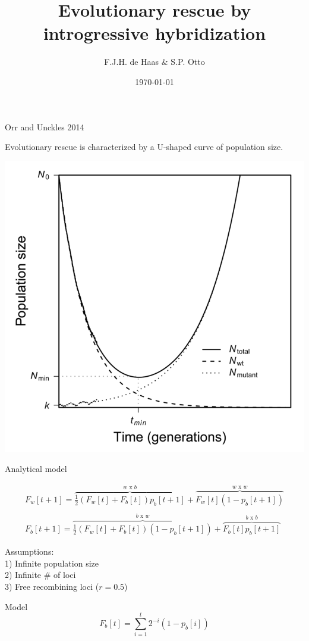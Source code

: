 \documentclass{beamer}
\title[lab meeting]{Evolutionary rescue by introgressive hybridization} %
\author{F.J.H. de Haas \& S.P. Otto} %
\date{\today} %
\begin{document}
\begin{frame}
\titlepage %
\end{frame}

\begin{frame}{Orr and Unckles 2014}

Evolutionary rescue is characterized by a U-shaped curve of population size.

\includegraphics[width=0.5\columnwidth]{Ushape_ER.png}

\end{frame}

\begin{frame}{Analytical model}

\begin{equation}
    \begin{array}{l}
	F_w[t+1] = \overbrace{\frac{1}{2} (F_w[t]+F_b[t]) p_b[t+1]}^\text{$w$ x $b$}  + \overbrace{F_w[t] (1-p_b[t+1])}^\text{$w$ x $w$}
	 \\ \\
	F_b[t+1]  = \overbrace{\frac{1}{2} (F_w[t]+F_b[t]) (1-p_b[t+1])}^\text{$b$ x $w$} 
	+ \overbrace{F_b[t] p_b[t+1]}^\text{$b$ x $b$}
	\end{array}
\end{equation}

Assumptions: \\
1) Infinite population size \\
2) Infinite \# of loci \\
3) Free recombining loci ($r = 0.5$) 
    
\end{frame}

\begin{frame}{Model}
    \begin{equation}
    F_b[t] = \sum_{i=1}^t 2^{-i} (1-p_b[i])
\end{equation}
\end{frame}
\end{document}

